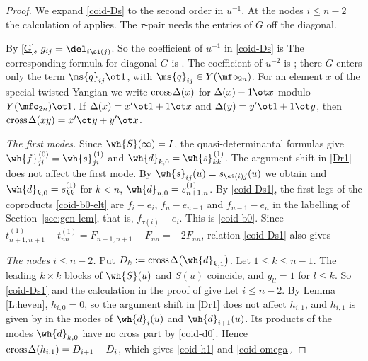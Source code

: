 \documentclass{amsart}
\numberwithin{equation}{section}
\theoremstyle{remark}
\renewcommand{\,}{\kern 0.1em} %
\begin{document}
\begin{proof}
%
We expand \eqref{coid-Ds} to the second order in $u^{-1}$. At the nodes $i\le n-2$ the
calculation of \cite[Prop.~5.20]{Re26} applies. The $\tau$-pair needs the entries of $G$ off the
diagonal.

By \eqref{G}, $g_{ij} = \del_{i\si(j)}$. So the coefficient of $u^{-1}$ in \eqref{coid-Ds} is
%
%
The corresponding formula for diagonal $G$ is \cite[(5.142)]{Re26}. The coefficient of $u^{-2}$ is
\cite[(5.143)]{Re26}; there $G$ enters only the term $\ms{q}_{ij}\ot1$, with
$\ms{q}_{ij}\in Y(\mfo_{2n})$. For an element $x$ of the special twisted Yangian we write
$\text{cross}\,\Delta(x)$ for $\Delta(x)-1\ot x$ modulo $Y(\mfo_{2n})\ot1$. If
$\Delta(x) = x'\ot1+1\ot x$ and $\Delta(y) = y'\ot1+1\ot y$, then
$\text{cross}\,\Delta(xy) = x'\ot y+y'\ot x$.

{\it The first modes.} Since $\wh{S}(\infty)=I$, the quasi-determinantal formulas give
$\wh{f}^{\,(0)}_{ji} = \wh{s}^{\,(1)}_{ji}$ and $\wh{d}_{k,0} = \wh{s}^{\,(1)}_{kk}$. The
argument shift in \eqref{Dr1} does not affect the first mode. By
$\wh{s}_{ij}(u) = s_{\si(i)j}(u)$ we obtain
%
%
and $\wh{d}_{k,0} = s^{(1)}_{kk}$ for $k<n$, $\wh{d}_{n,0} = s^{(1)}_{n+1,n}$. By
\eqref{coid-Ds1}, the first legs of the coproducts \eqref{coid-b0-elt} are $f_i-e_i$,
$f_n-e_{n-1}$ and $f_{n-1}-e_n$ in the labelling of Section~\ref{sec:gen-lem}, that is,
$f_{\tau(i)}-e_i$. This is \eqref{coid-b0}. Since
$t^{(1)}_{n+1,n+1}-t^{(1)}_{nn} = F_{n+1,n+1}-F_{nn} = -2F_{nn}$, relation \eqref{coid-Ds1} also
gives
%

{\it The nodes $i\le n-2$.} Put $D_k := \text{cross}\,\Delta\big(\wh{d}_{k,1}\big)$. Let
$1\le k\le n-1$. The leading $k\times k$ blocks of $\wh{S}(u)$ and $S(u)$ coincide, and
$g_{ll}=1$ for $l\le k$. So \eqref{coid-Ds1} and the calculation in the proof of
\cite[Prop.~5.20]{Re26} give
%
%
Let $i\le n-2$. By Lemma \ref{L:heven}, $h_{i,0}=0$, so the argument shift in \eqref{Dr1} does
not affect $h_{i,1}$, and $h_{i,1}$ is given by \cite[(5.144)]{Re26} in the modes of
$\wh{d}_i(u)$ and $\wh{d}_{i+1}(u)$. Its products of the modes $\wh{d}_{k,0}$ have no cross part
by \eqref{coid-d0}. Hence $\text{cross}\,\Delta(h_{i,1}) = D_{i+1}-D_i$, which gives
\eqref{coid-h1} and \eqref{coid-omega}.


\end{proof}
\end{document}

